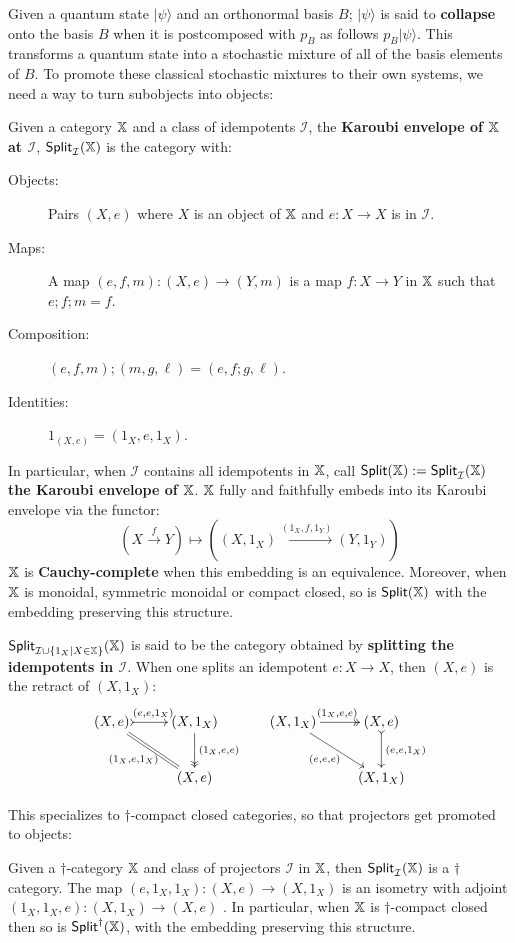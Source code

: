 Given a quantum state $| \psi \rangle$ and an orthonormal basis  $B$; $|\psi\rangle$ is said to {\bf collapse} onto the basis  $B$  when it is postcomposed with $p_B$ as follows $p_B|\psi\rangle$.  This  transforms a quantum state into a stochastic mixture of all of the basis elements of $B$.
To promote these classical stochastic mixtures to their own systems, we need a way to turn subobjects into objects:
\begin{definition}
\label{def:idem}
Given a category $\mathbb{X}$ and a class of idempotents $\mathcal I$, the {\bf Karoubi envelope of $\mathbb{X}$ at $\mathcal{I}$}, ${\sf Split}_{\mathcal I}(\mathbb{X})$ is the category with:
\begin{description}
\item[Objects:] Pairs $(X,e)$ where $X$ is an object of $\mathbb{X}$ and $e:X\to X$ is in $\mathcal I$.
\item[Maps:] A map $(e,f,m):(X,e)\to (Y,m)$ is a map $f:X\to Y$ in $\mathbb{X}$ such that $e;f;m=f$.
\item[Composition:] $(e,f,m);(m,g,\ell) = (e,f;g,\ell)$.
\item[Identities:] $1_{(X,e)}=(1_X,e,1_X)$.
\end{description}
In particular, when $\mathcal{I}$ contains all idempotents in $\mathbb{X}$, call  ${\sf Split}(\mathbb{X}):={\sf Split}_{\mathcal I}(\mathbb{X})$ {\bf the Karoubi envelope of $\mathbb{X}$}.
$\mathbb{X}$ fully and faithfully embeds into its Karoubi envelope via the functor:
$$
\left(X\xrightarrow{f}Y\right)
\mapsto 
\left((X,1_X)\xrightarrow{(1_X,f,1_Y)}(Y,1_Y)\right)
$$
$\mathbb{X}$ is {\bf Cauchy-complete} when this embedding is an equivalence. 
Moreover, when $\mathbb{X}$ is monoidal, symmetric monoidal or compact closed, so is ${\sf Split}(\mathbb{X})$ with the embedding preserving this structure.


${\sf Split}_{{\mathcal I }\cup \{ 1_X | X \in \mathbb{X}\}}(\mathbb{X})$ is said to be the category obtained by {\bf splitting the idempotents in $\mathcal I$}.
When one splits an idempotent $e:X\to X$, then $(X,e)$ is the retract of $(X, 1_X)$:
$$
\xymatrix{
(X,e) \ar@{>->}[r]^{(e,e,1_X)} \ar@{=}[dr]_{(1_X,e,1_X)} & (X,1_X)  \ar@{->>}[d]^{(1_X,e,e)}\\
& (X,e)
}\, \hspace*{.5cm}
\xymatrix{
(X,1_X) \ar@{->>}[r]^{(1_X,e,e)} \ar[dr]_{(e,e,e)} & (X,e)  \ar@{>->}[d]^{(e,e,1_X)}\\
& (X,1_X)
}
$$
\end{definition}
This specializes to $\dag$-compact closed categories, so that projectors get promoted to objects:
\begin{definition}
\label{def:dagidem}
Given a $\dag$-category $\mathbb{X}$ and class of projectors $\mathcal I$ in $\mathbb{X}$, then  ${\sf Split}_{\mathcal I}(\mathbb{X})$ is a $\dag$ category.
The map $(e,1_X, 1_X) :(X,e)\to (X,1_X)$ is an isometry with adjoint $(1_X,1_X, e) :(X,1_X)\to (X,e)$ .
In particular, when $\mathbb{X}$ is $\dag$-compact closed then so is ${\sf Split}^\dag(\mathbb{X})$, with the embedding preserving this structure.
\end{definition}
